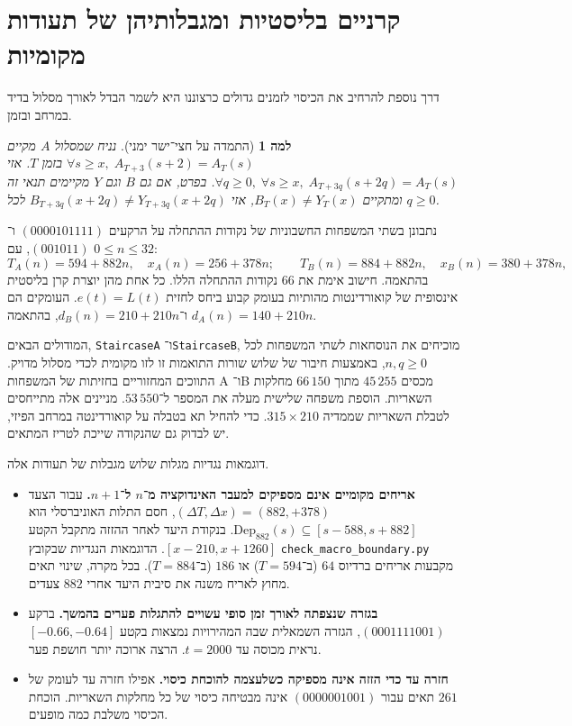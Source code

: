 \documentclass[11pt,a4paper]{article}
\DeclareRobustCommand{\textenglish}[1]{\foreignlanguage{english}{#1}}
\newtheorem{lemma}[theorem]{למה}
\begin{document}
\section{קרניים בליסטיות ומגבלותיהן של תעודות מקומיות}

דרך נוספת להרחיב את הכיסוי לזמנים גדולים כרצוננו היא לשמר הבדל לאורך מסלול בדיד במרחב ובזמן.

\begin{lemma}[התמדה על חצי־ישר ימני]\label{lem:ballistic_ray}
נניח שמסלול $A$ מקיים $\forall s \ge x,\; A_{T+3}(s + 2) = A_T(s)$ בזמן $T$. אזי $\forall q \ge 0,\; \forall s \ge x,\; A_{T+3q}(s + 2q) = A_T(s)$. בפרט, אם גם $B$ וגם $Y$ מקיימים תנאי זה ומתקיים $B_T(x) \ne Y_T(x)$, אזי $B_{T+3q}(x + 2q) \ne Y_{T+3q}(x + 2q)$ לכל $q \ge 0$.
\end{lemma}

נתבונן בשתי המשפחות החשבוניות של נקודות ההתחלה על הרקעים $(0000101111)$ ו־$(001011)$, עם $0 \le n \le 32$:
\begin{equation}
T_A(n) = 594 + 882n,\quad x_A(n) = 256 + 378n; \qquad
T_B(n) = 884 + 882n,\quad x_B(n) = 380 + 378n,
\end{equation}
בהתאמה. חישוב אימת את $66$ נקודות ההתחלה הללו. כל אחת מהן יוצרת קרן בליסטית אינסופית של קואורדינטות מהותיות בעומק קבוע ביחס לחזית $e(t) = L(t)$. העומקים הם $d_A(n) = 140 + 210n$ ו־$d_B(n) = 210 + 210n$, בהתאמה.

המודולים הבאים, \textenglish{\texttt{StaircaseA}} ו־\textenglish{\texttt{StaircaseB}}, מוכיחים את הנוסחאות לשתי המשפחות לכל $n,q\ge0$, באמצעות חיבור של שלוש שורות התואמות זו לזו מקומית לכדי מסלול מדויק. התווכים המחזוריים בחזיתות של המשפחות \textenglish{A} ו־\textenglish{B} מכסים $45\,255$ מתוך $66\,150$ מחלקות השאריות. הוספת משפחה שלישית מעלה את המספר ל־$53\,550$. מניינים אלה מתייחסים לטבלת השאריות שממדיה $315\times210$. כדי להחיל תא בטבלה על קואורדינטה במרחב הפיזי, יש לבדוק גם שהנקודה שייכת לטריז המתאים.

דוגמאות נגדיות מגלות שלוש מגבלות של תעודות אלה.
\begin{itemize}
    \item \textbf{אריחים מקומיים אינם מספיקים למעבר האינדוקציה מ־$n$ ל־$n+1$.} עבור הצעד $(\Delta T, \Delta x) = (882, +378)$, חסם התלות האוניברסלי הוא $\mathrm{Dep}_{882}(s) \subseteq [s - 588, s + 882]$. בנקודת היעד לאחר ההזזה מתקבל הקטע $[x - 210, x + 1260]$. הדוגמאות הנגדיות שבקובץ \textenglish{\texttt{check\_macro\_boundary.py}} מקבעות אריחים ברדיוס $64$ (ב־$T=594$) או $186$ (ב־$T=884$). בכל מקרה, שינוי תאים מחוץ לאריח משנה את סיבית היעד אחרי $882$ צעדים.
    \item \textbf{בגזרה שנצפתה לאורך זמן סופי עשויים להתגלות פערים בהמשך.} ברקע $(0001111001)$, הגזרה השמאלית שבה המהירויות נמצאות בקטע $[-0.66, -0.64]$ נראית מכוסה עד $t = 2000$. הרצה ארוכה יותר חושפת פער.
    \item \textbf{חזרה עד כדי הזזה אינה מספיקה כשלעצמה להוכחת כיסוי.} אפילו חזרה עד לעומק של $261$ תאים עבור $(0000001001)$ אינה מבטיחה כיסוי של כל מחלקות השאריות. הוכחת הכיסוי משלבת כמה מופעים.
\end{itemize}
\end{document}
